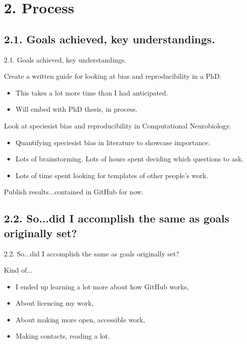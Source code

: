 \documentclass[t]{beamer}
\begin{document}
\section{2. Process}
\subsection{2.1. Goals achieved, key understandings.}
\begin{frame}{2.1. Goals achieved, key understandings.}
	\begin{block}{Create a written guide for looking at bias and reproducibility in a PhD.}
  		\begin{itemize}    
  			\item This takes a lot more time than I had anticipated.
  			\item Will embed with PhD thesis, in process.
  		\end{itemize}    
	\end{block}
 
	\begin{block}{Look at speciesist bias and reproducibility in Computational Neurobiology.}
  		\begin{itemize}    
  			\item Quantifying speciesist bias in literature to showcase importance.
  			\item Lots of brainstorming. Lots of hours spent deciding which questions to ask.
                \item Lots of time spent looking for templates of other people's work.
  		\end{itemize}    
	\end{block}
        \begin{block}{Publish results...contained in GitHub for now.}   
	\end{block}
\end{frame}

\subsection{2.2. So...did I accomplish the same as goals originally set?}
\begin{frame}{2.2. So...did I accomplish the same as goals originally set?}
	\begin{block}{Kind of...}
  		\begin{itemize}    
  			\item I ended up learning a lot more about how GitHub works,
  			\item About licencing my work,
                \item About making more open, accessible work,
                \item Making contacts, reading a lot.
  		\end{itemize}    
	\end{block}
\end{frame}
\end{document}

